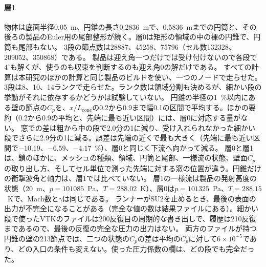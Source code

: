 \documentclass[twocolumn]{labreport}
\newcommand{\Cp}{C_p}
\begin{document}
\paragraph{層1}
物体は底面半径0.05~m、円錐の長さ0.2836~mで、0.5836~mまでの円筒と、その後ろの製品のEuler用の尾部整形が続く。層0は矩形の領域の中の裸の円錐で、円筒も尾部もない。
3段の節点数は28887、45258、75796（セル数132328、209052、350868）である。
製品は迎え角一つだけでは受け付けないので各段で$4^\circ$も解くが、使うのも収束を判断するのも迎え角0の解だけである。
すべての計算は本研究のほかの計算と同じ製品のビルドを使い、一つのノードで走らせた。
3段は8、10、14ランクで走らせた。ランク数は領域分割も決めるが、細かい段の挙動がそれに依存するかどうかは試験していない。
円錐の半径の1~\%以内にある壁の節点の$\Cp$を、$x/L_\mathrm{cone}$の0.2から0.9まで幅0.1の区間で平均する。ほかの要約（0.2から0.9の平均と、先端に最も近い区間）には、層0に対応する量がない。
窓での差は粗から中の段で2.0分の1に減り、受け入れられなかった細かい段でさらに2.9分の1に減る。誤差は先端の近くで最も大きく（先端に最も近い区間で$-10.19$、$-6.59$、$-4.17$~\%）、層0と同じく下流へ向かって減る。
層0と層1は、鎖のほかに、メッシュの種類、領域、円筒と尾部、一様流の状態、壁面$\Cp$の取り出し方、そしてセル単位で測った先端に対する窓の位置が違う。円錐だけの衝撃波角と軸力は、層1では比べていない。
層1の一様流は製品の発射高度の状態（20~m、$p=101085$~Pa、$T=288.02$~K）、層0は$p=101325$~Pa、$T=288.15$~Kで、Mach数と$\gamma$は同じである。
ランナーがSU2を止めるとき、最後の表面の出力が不完全になることがある（完全な値の数は結果ファイルにある）。細かい段で使ったVTKのファイルは200反復目の周期的な書き出しで、履歴は210反復まであるので、最後の反復の完全な圧力の出力はない。
両方のファイルが持つ円錐の壁の213節点では、二つの状態の$\Cp$の差は平均の$\Cp$に対して$6\times10^{-5}$であり、どの入口の条件も変えない。使った圧力係数の欄は、どの段でも完全だった。
\end{document}
